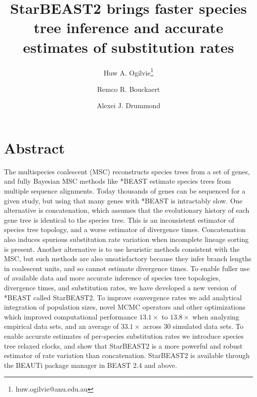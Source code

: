 \documentclass[12pt]{article}
\begin{document}
\title{StarBEAST2 brings faster species tree inference and accurate estimates of substitution rates}
\author[1,2]{Huw A. Ogilvie\thanks{huw.ogilvie@anu.edu.au}}
\author[2,3]{Remco R. Bouckaert}
\author[2,3]{Alexei J. Drummond}

\maketitle

\clearpage

\justifying

\section*{Abstract}

The multispecies coalescent (MSC) reconstructs species trees from a set of
genes, and fully Bayesian MSC methods like *BEAST estimate species trees from
multiple sequence alignments. Today thousands of genes can be sequenced for a
given study, but using that many genes with *BEAST is intractably slow. One
alternative is concatenation, which assumes that the evolutionary history of
each gene tree is identical to the species tree. This is an inconsistent
estimator of species tree topology, and a worse estimator of divergence times.
Concatenation also induces spurious substitution rate variation when
incomplete lineage sorting is present. Another alternative is to use heuristic methods consistent with the MSC, but such methods are also unsatisfactory because they
infer branch lengths in coalescent units, and so cannot estimate divergence
times. To enable fuller use of available data and more accurate inference of
species tree topologies, divergence times, and substitution rates, we have
developed a new version of *BEAST called StarBEAST2. To improve convergence
rates we add analytical integration of population sizes, novel MCMC operators
and other optimizations which improved computational performance
$13.1\times$ to $13.8\times$ when analyzing empirical data sets, and an average of
$33.1\times$ across 30 simulated data sets. To enable accurate estimates of
per-species substitution rates we introduce species tree relaxed clocks, and
show that StarBEAST2 is a more powerful and robust estimator of rate variation
than concatenation. StarBEAST2 is available through the BEAUTi package manager
in BEAST 2.4 and above.
\end{document}
